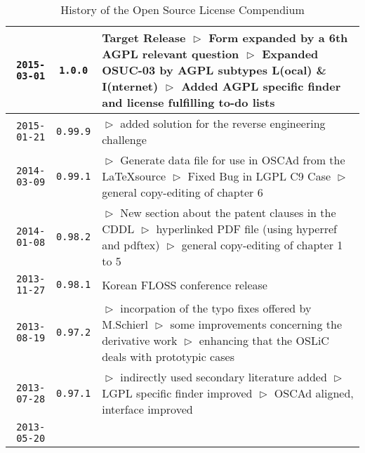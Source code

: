 \begin{table}
\footnotesize
\caption{History of the Open Source License Compendium}
\begin{center}
\begin{tabular}{|r|c|p{9.4cm}|}
\hline
    \texttt{2015-03-01}
  & \texttt{1.0.0}
  & Target Release\newline
  $\vartriangleright$ Form expanded by a 6th AGPL relevant question\newline
  $\vartriangleright$ Expanded OSUC-03 by AGPL subtypes L(ocal) \& I(nternet) \newline 
  $\vartriangleright$ Added AGPL specific finder and license fulfilling to-do lists\\
\hline
    \texttt{2015-01-21}
  & \texttt{0.99.9}
  & $\vartriangleright$ added solution for the reverse engineering challenge \\
\hline
    \texttt{2014-03-09}
  & \texttt{0.99.1}
  & $\vartriangleright$ Generate data file for use in OSCAd from the \LaTeX source\newline
  $\vartriangleright$ Fixed Bug in LGPL C9 Case \newline
  $\vartriangleright$ general copy-editing of chapter 6\\
\hline
    \texttt{2014-01-08}
  & \texttt{0.98.2}
  & $\vartriangleright$ New section about the patent clauses in the CDDL\newline
  $\vartriangleright$ hyperlinked PDF file (using hyperref and pdftex)\newline
  $\vartriangleright$ general copy-editing of chapter 1 to 5\\
\hline
    \texttt{2013-11-27}
  & \texttt{0.98.1}
  & Korean FLOSS conference release\\
\hline
    \texttt{2013-08-19}
  & \texttt{0.97.2}
  & $\vartriangleright$ incorpation of the typo fixes offered by M.Schierl\newline
  $\vartriangleright$ some improvements concerning the derivative work\newline
  $\vartriangleright$ enhancing that the OSLiC deals with prototypic cases\\
\hline
    \texttt{2013-07-28}
  & \texttt{0.97.1} 
  & $\vartriangleright$ indirectly used secondary literature added\newline
    $\vartriangleright$ LGPL specific finder improved\newline
    $\vartriangleright$ OSCAd aligned, interface improved\\
\hline
    \texttt{2013-05-20}

\end{tabular}
\end{center}
\end{table}
